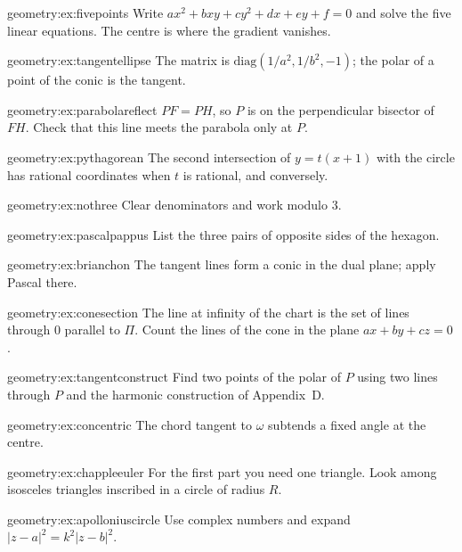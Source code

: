 \begin{hint}{geometry:ex:fivepoints}
Write $ax^2+bxy+cy^2+dx+ey+f=0$ and solve the five linear equations. The centre is where the gradient vanishes.
\end{hint}
\begin{hint}{geometry:ex:tangentellipse}
The matrix is $\mathrm{diag}(1/a^2,1/b^2,-1)$; the polar of a point of the conic is the tangent.
\end{hint}
\begin{hint}{geometry:ex:parabolareflect}
$PF=PH$, so $P$ is on the perpendicular bisector of $FH$. Check that this line meets the parabola only at $P$.
\end{hint}
\begin{hint}{geometry:ex:pythagorean}
The second intersection of $y=t(x+1)$ with the circle has rational coordinates when $t$ is rational, and conversely.
\end{hint}
\begin{hint}{geometry:ex:nothree}
Clear denominators and work modulo $3$.
\end{hint}
\begin{hint}{geometry:ex:pascalpappus}
List the three pairs of opposite sides of the hexagon.
\end{hint}
\begin{hint}{geometry:ex:brianchon}
The tangent lines form a conic in the dual plane; apply Pascal there.
\end{hint}
\begin{hint}{geometry:ex:conesection}
The line at infinity of the chart is the set of lines through $0$ parallel to $\Pi$. Count the lines of the cone in the plane $ax+by+cz=0$.
\end{hint}
\begin{hint}{geometry:ex:tangentconstruct}
Find two points of the polar of $P$ using two lines through $P$ and the harmonic construction of Appendix~D.
\end{hint}
\begin{hint}{geometry:ex:concentric}
The chord tangent to $\omega$ subtends a fixed angle at the centre.
\end{hint}
\begin{hint}{geometry:ex:chappleeuler}
For the first part you need one triangle. Look among isosceles triangles inscribed in a circle of radius $R$.
\end{hint}
\begin{hint}{geometry:ex:apolloniuscircle}
Use complex numbers and expand $|z-a|^2=k^2|z-b|^2$.
\end{hint}

